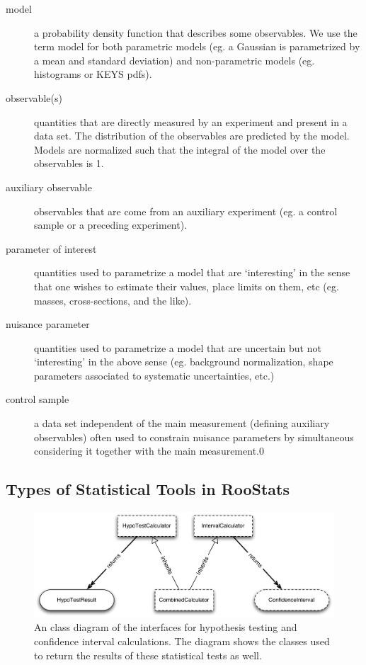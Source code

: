 \documentclass[11pt]{article}
\begin{document}
\begin{description}
\item[ model ] a probability density function that describes some observables.  We use the term model for both parametric models (eg. a Gaussian is parametrized by a mean and standard deviation) and non-parametric models (eg. histograms or KEYS pdfs).

\item[ observable(s)] quantities that are directly measured by an experiment and present in a data set.  The distribution of the observables are predicted by the model.  Models are normalized such that the integral of the model over the observables is 1.

\item[ auxiliary observable] observables that are come from an auxiliary experiment (eg. a control sample or a preceding experiment).

\item[ parameter of interest] quantities used to parametrize a model that are `interesting' in the sense that one wishes to estimate their values,  place limits on them, etc (eg. masses, cross-sections, and the like).

\item[ nuisance parameter ] quantities used to parametrize a model that are uncertain but not `interesting' in the above sense (eg. background normalization, shape parameters associated to systematic uncertainties, etc.)

\item[ control sample ] a data set independent of the main measurement (defining auxiliary observables) often used to constrain nuisance parameters by simultaneous considering it together with the main measurement.0

\end{description}

\subsection{Types of Statistical Tools in RooStats}

\begin{figure}[htbp]
\begin{center}
\includegraphics[width=\textwidth]{RooStats_OverviewOfInterfaces.pdf}
\caption{An class diagram of the interfaces for hypothesis testing and confidence interval calculations.  The diagram shows the classes used to return the results of these statistical tests as well.}
\label{fig:OverviewOfInterfaces}
\end{center}
\end{figure}
\end{document}
